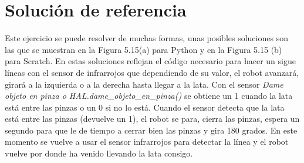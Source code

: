 \section{Solución de referencia}
Este ejercicio se puede resolver de muchas formas, unas posibles soluciones son las que se muestran en la Figura 5.15(a) para Python y  en la Figura 5.15 (b) para Scratch. 
En estas soluciones reflejan el código necesario para hacer un sigue líneas con el sensor de infrarrojos que dependiendo de su valor, el robot avanzará, girará a la izquierda o a la derecha hasta llegar a la lata. Con el sensor \textit{Dame objeto en pinza o HAL.dame\_objeto\_en\_pinza()} se obtiene un 1 cuando la lata está entre las pinzas o un 0 si no lo está. Cuando el sensor detecta que la lata está entre las pinzas (devuelve un 1), el robot se para, cierra las pinzas, espera un segundo para que le de tiempo a cerrar bien las pinzas y gira 180 grados. En este momento se vuelve a usar el sensor infrarrojos para detectar la línea y el robot vuelve por donde ha venido llevando la lata consigo.

